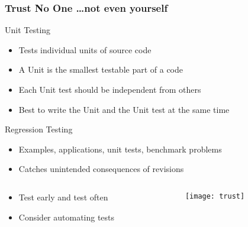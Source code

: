\documentclass[mathserif]{beamer}
\begin{document}
%
%
%
\begin{frame}
\frametitle{Trust No One \ldots not even yourself}
\begin{block}{Unit Testing}
\begin{footnotesize}
\begin{itemize}
\item Tests individual units of source code 
\item A Unit is the smallest testable part of a code
\item Each Unit test should be independent from others
\item Best to write the Unit and the Unit test at the same time
\end{itemize}
\end{footnotesize}
\end{block}

\begin{block}{Regression Testing}
\begin{footnotesize}
\begin{itemize}
\item Examples, applications, unit tests, benchmark problems
\item Catches unintended consequences of revisions
\end{itemize}
\end{footnotesize}
\begin{columns}[c]
\begin{column}{7cm}
\begin{footnotesize}
\begin{itemize}
\item Test early and test often
\item Consider automating tests 
\end{itemize}
\end{footnotesize}
\end{column}
\begin{column}{4.7cm}
\texttt{[image: trust]}
\end{column}
\end{columns}
\end{block}
\end{frame}
\end{document}
